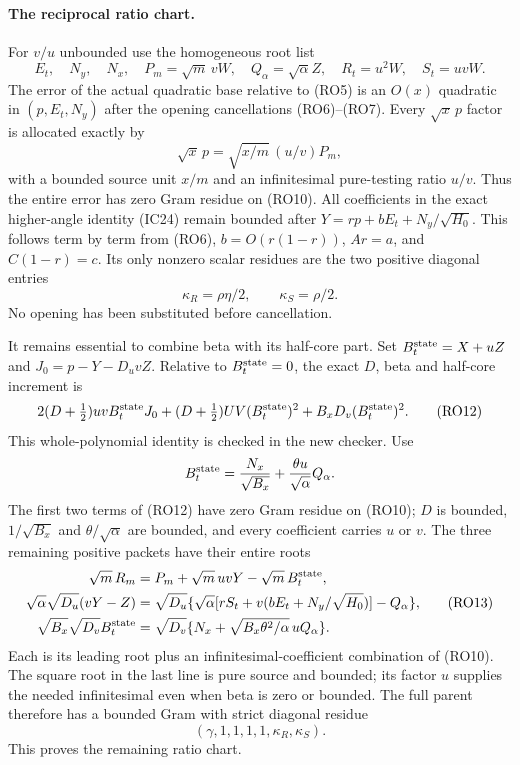 \paragraph{The reciprocal ratio chart.}
For $v/u$ unbounded use the homogeneous root list
\[
 E_t,\quad N_y,\quad N_x,\quad P_m=\sqrt m\,vW,
 \quad Q_\alpha=\sqrt\alpha Z,\quad R_t=u^2W,
 \quad S_t=uvW.                                      \tag{RO10}
\]
The error of the actual quadratic base relative to (RO5) is an
$O(x)$ quadratic in $(p,E_t,N_y)$ after the opening cancellations
(RO6)--(RO7). Every $\sqrt x\,p$ factor is allocated exactly by
\[
 \sqrt x\,p=\sqrt{x/m}\,(u/v)P_m,
\]
with a bounded source unit $x/m$ and an infinitesimal pure-testing
ratio $u/v$. Thus the entire error has zero Gram residue on (RO10).
All coefficients in the exact higher-angle identity (IC24) remain
bounded after $Y=rp+bE_t+N_y/\sqrt{H_0}$. This follows term
by term from (RO6), $b=O(r(1-r))$, $Ar=a$, and $C(1-r)=c$.
Its only nonzero scalar residues are the two positive diagonal entries
\[
                 \kappa_R=\rho\eta/2,\qquad
                 \kappa_S=\rho/2.                  \tag{RO11}
\]
No opening has been substituted before cancellation.

It remains essential to combine beta with its half-core part. Set
$B_t^{\rm state}=X+uZ$ and $J_0=p-Y-D_uvZ$. Relative to
$B_t^{\rm state}=0$, the exact $D$, beta and half-core increment is
\[
 2(D+\tfrac12)uvB_t^{\rm state}J_0
 +(D+\tfrac12)UV(B_t^{\rm state})^2
 +B_xD_v(B_t^{\rm state})^2.                          \tag{RO12}
\]
This whole-polynomial identity is checked in the new checker. Use
\[
 B_t^{\rm state}={N_x\over\sqrt{B_x}}
               +{\theta u\over\sqrt\alpha}Q_\alpha.
\]
The first two terms of (RO12) have zero Gram residue on (RO10);
$D$ is bounded, $1/\sqrt{B_x}$ and $\theta/\sqrt\alpha$
are bounded, and every coefficient carries $u$ or $v$.
The three remaining positive packets have their entire roots
\[
\begin{aligned}
 \sqrt m\,R_m&=P_m+\sqrt m\,uvY-\sqrt m\,B_t^{\rm state},\\
 \sqrt\alpha\sqrt{D_u}(vY-Z)
   &=\sqrt{D_u}\{\sqrt\alpha[rS_t+v(bE_t+N_y/\sqrt{H_0})]
                         -Q_\alpha\},\\
 \sqrt{B_x}\sqrt{D_v}B_t^{\rm state}
   &=\sqrt{D_v}\{N_x+\sqrt{B_x\theta^2/\alpha}\,uQ_\alpha\}.
\end{aligned}                                                    \tag{RO13}
\]
Each is its leading root plus an infinitesimal-coefficient combination
of (RO10). The square root in the last line is pure source and bounded;
its factor $u$ supplies the needed infinitesimal even when beta is
zero or bounded. The full parent therefore has a bounded Gram with
strict diagonal residue
\[
                 (\gamma,1,1,1,1,\kappa_R,\kappa_S).
                                                               \tag{RO14}
\]
This proves the remaining ratio chart.

